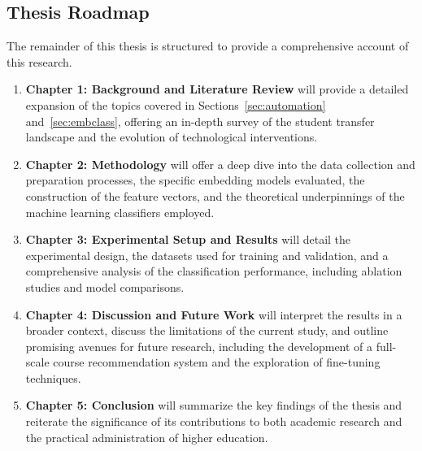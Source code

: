 \begin{introduction}
\subsection{Thesis Roadmap}
The remainder of this thesis is structured to provide a comprehensive account of this research.
\begin{enumerate}
\item \textbf{Chapter 1: Background and Literature Review} will provide a detailed expansion of the topics covered in Sections~\ref{sec:automation} and~\ref{sec:embclass}, offering an in-depth survey of the student transfer landscape and the evolution of technological interventions.
\item \textbf{Chapter 2: Methodology} will offer a deep dive into the data collection and preparation processes, the specific embedding models evaluated, the construction of the feature vectors, and the theoretical underpinnings of the machine learning classifiers employed.
\item \textbf{Chapter 3: Experimental Setup and Results} will detail the experimental design, the datasets used for training and validation, and a comprehensive analysis of the classification performance, including ablation studies and model comparisons.
\item \textbf{Chapter 4: Discussion and Future Work} will interpret the results in a broader context, discuss the limitations of the current study, and outline promising avenues for future research, including the development of a full-scale course recommendation system and the exploration of fine-tuning techniques.
\item \textbf{Chapter 5: Conclusion} will summarize the key findings of the thesis and reiterate the significance of its contributions to both academic research and the practical administration of higher education.
\end{enumerate}

\end{introduction}
